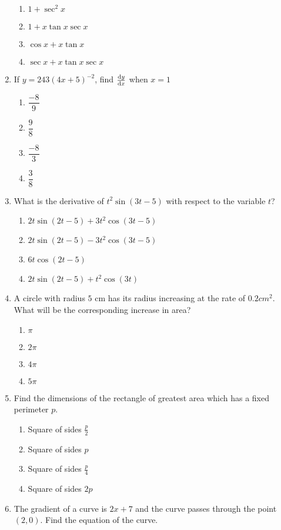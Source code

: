 \begin{multicols}{2}
\begin{enumerate}[label={\arabic*.}]
\begin{enumerate}[label={\Alph*.}]
	\item \(1 + \sec^{2}x\)
	\item \(1 + x\tan x\sec x\)
	\item \(\cos x + x\tan x \)
	\item \(\sec x + x\tan x \sec x\)
	\end{enumerate}
\item If \(y=243{(4x+5)}^{-2}\), find \(\dv{y}{x}\) when \(x=1\)
	\begin{enumerate}[label={\Alph*.}]
	\item \(\dfrac{-8}{9}\)
	\item \(\dfrac{9}{8}\)
	\item \(\dfrac{-8}{3}\)
	\item \(\dfrac{3}{8}\)
	\end{enumerate}
\item What is the derivative of \({t}^{2}\sin(3t-5)\) with respect to the variable \(t\)?
	\begin{enumerate}[label={\Alph*.}]
	\item \(2t \sin(2t-5) + 3{t}^2\cos(3t-5)\)
	\item \(2t \sin(2t-5) - 3{t}^2\cos(3t-5)\)
	\item \(6t\cos(2t-5)\)
	\item \(2t \sin(2t-5) + t^2\cos(3t)\)
	\end{enumerate}
\item A circle with radius \(5\) cm has its radius increasing at the rate of \(0.2 {cm}^2\). What will be the corresponding increase in area?
	\begin{enumerate}[label={\Alph*.}]
	\item \(\pi\)
	\item \(2\pi\)
	\item \(4\pi\)
	\item \(5\pi\)
	\end{enumerate}
\item Find the dimensions of the rectangle of greatest area which has a fixed perimeter \(p\).
	\begin{enumerate}[label={\Alph*.}]
	\item Square of sides \(\frac{p}{2}\)
	\item Square of sides \(p\)
	\item Square of sides \(\frac{p}{4}\)
	\item Square of sides \(2p\)
	\end{enumerate}
\item The gradient of a curve is \(2x+7\) and the curve passes through the point \((2, 0)\). Find the equation of the curve.

\end{enumerate}
\end{multicols}

